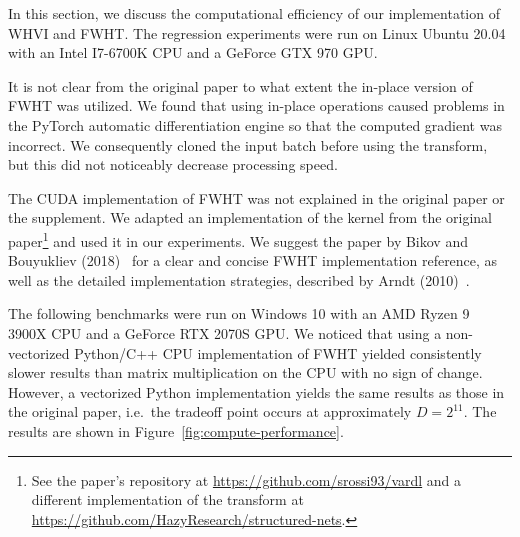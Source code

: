 
In this section, we discuss the computational efficiency of our implementation of WHVI and FWHT\@.
The regression experiments were run on Linux Ubuntu 20.04 with an Intel I7-6700K CPU and a GeForce GTX 970 GPU\@.

It is not clear from the original paper to what extent the in-place version of FWHT was utilized.
We found that using in-place operations caused problems in the PyTorch automatic differentiation engine so that the computed gradient was incorrect.
We consequently cloned the input batch before using the transform, but this did not noticeably decrease processing speed.

The CUDA implementation of FWHT was not explained in the original paper or the supplement.
We adapted an implementation of the kernel from the original paper\footnote{See the paper's repository at \url{https://github.com/srossi93/vardl} and a different implementation of the transform at \url{https://github.com/HazyResearch/structured-nets}.} and used it in our experiments.
We suggest the paper by Bikov and Bouyukliev (2018)~\cite{bikov2018parallel} for a clear and concise FWHT implementation reference, as well as the detailed implementation strategies, described by Arndt (2010)~\cite{arndt2010matters}.

The following benchmarks were run on Windows 10 with an AMD Ryzen 9 3900X CPU and a GeForce RTX 2070S GPU\@.
We noticed that using a non-vectorized Python/C++ CPU implementation of FWHT yielded consistently slower results than matrix multiplication on the CPU with no sign of change.
However, a vectorized Python implementation yields the same results as those in the original paper, i.e.\ the tradeoff point occurs at approximately $D = 2^{11}$.
The results are shown in Figure~\ref{fig:compute-performance}.

